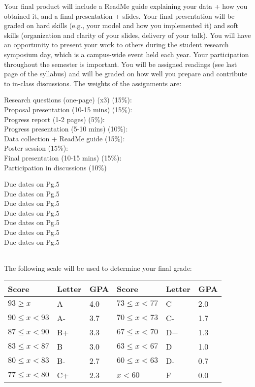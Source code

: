 \documentclass[11pt,letter]{article}
\begin{document}
Your final product will include a ReadMe guide explaining your data + how you obtained it, and a final presentation + slides. Your final presentation will be graded on hard skills (e.g., your model and how you implemented it) and soft skills (organization and clarity of your slides, delivery of your talk). You will have an opportunity to present your work to others during the student research symposium day, which is a campus-wide event held each year. Your participation throughout the semester is important. You will be assigned readings (see last page of the syllabus) and will be graded on how well you prepare and contribute to in-class discussions. The weights of the assignments are:


\begin{minipage}{.9\textwidth}
Research questions (one-page) (x3) (15\%): \\
Proposal presentation (10-15 mins) (15\%): \\
Progress report (1-2 pages) (5\%): \\
Progress presentation (5-10 mins) (10\%): \\
Data collection + ReadMe guide (15\%): \\
Poster session (15\%):\\
Final presentation (10-15 mins) (15\%):\\
Participation in discussions (10\%)
\end{minipage}%
\hspace*{-5cm}
\begin{minipage}{.5\textwidth}
Due dates on Pg.5 \\
Due dates on Pg.5 \\
Due dates on Pg.5 \\
Due dates on Pg.5 \\
Due dates on Pg.5 \\
Due dates on Pg.5\\
Due dates on Pg.5\\
\end{minipage} \\

\clearpage
The following scale will be used to determine your final grade:

\begin{center}
\begin{tabular}{lll@{\hskip .5in}lll}
\textbf{Score} & \textbf{Letter} & \textbf{GPA} & \textbf{Score} & \textbf{Letter} & \textbf{GPA}\\
\hline
$93 \geq x$	&	A	&	4.0 &  $73 \leq x < 77$	&	C	&	2.0\\
$90 \leq x < 93$	&	A-	&	3.7 & $70 \leq x < 73$	&	C-	&	1.7\\
$87 \leq x < 90$	&	B+	&	3.3 & $67 \leq x < 70$	&	D+	&	1.3\\
$83 \leq x < 87$	&	B	&	3.0 & $63 \leq x < 67$	&	D	&	1.0\\
$80 \leq x < 83$	&	B-	&	2.7 & $60 \leq x < 63$	&	D-	&	0.7\\
$77 \leq x < 80$	&	C+	&	2.3 & $x < 60$	&	F	&	0.0\\

\end{tabular}
\end{center}
\end{document}
